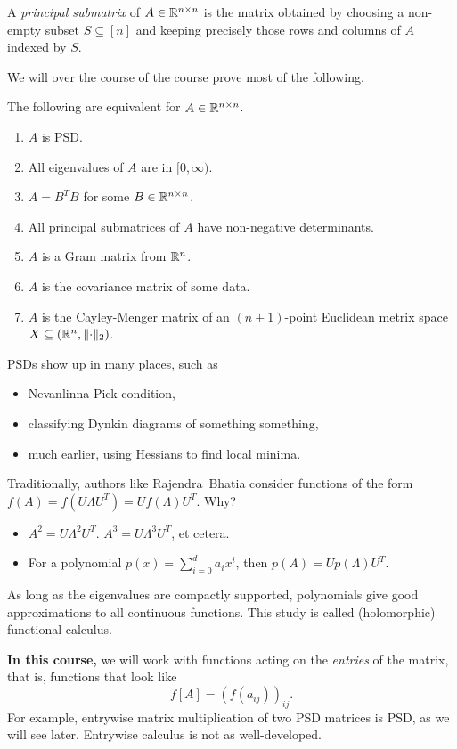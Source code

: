 A \emph{principal submatrix} of $A \in \mathbb{R}^{n \times n}$ is the matrix
obtained by choosing a non-empty subset $S \subseteq [n]$ and keeping
precisely those rows and columns of $A$ indexed by $S$.

We will over the course of the course prove most of the following.
\begin{theorem}
    The following are equivalent for $A \in \mathbb{R}^{n \times n}$.
    \begin{enumerate}
        \item $A$ is PSD.
        \item All eigenvalues of $A$ are in $[0, \infty)$.
        \item $A = B^T B$ for some $B \in \mathbb{R}^{n \times n}$.
        \item All principal submatrices of $A$ have non-negative
            determinants.
        \item $A$ is a Gram matrix from $\mathbb{R}^n$.
        \item $A$ is the covariance matrix of some data.
        \item $A$ is the Cayley-Menger matrix of an $(n + 1)$-point
            Euclidean metrix space $X \subseteq (\mathbb{R}^n, \lVert\cdot\rVert_2)$.
    \end{enumerate}
\end{theorem}
PSDs show up in many places, such as
\begin{itemize}
    \item Nevanlinna-Pick condition,
    \item classifying Dynkin diagrams of something something,
    \item much earlier, using Hessians to find local minima.
\end{itemize}

Traditionally, authors like Rajendra~Bhatia consider functions of the form
$f(A) = f(U \Lambda U^T) = U f(\Lambda) U^T$.
Why?
\begin{itemize}
    \item $A^2 = U \Lambda^2 U^T$.
        $A^3 = U \Lambda^3 U^T$, et cetera.
    \item For a polynomial $p(x) = \sum_{i=0}^d a_i x^i$, then
        $p(A) = U p(\Lambda) U^T$.
\end{itemize}
As long as the eigenvalues are compactly supported, polynomials give good
approximations to all continuous functions.
This study is called (holomorphic) functional calculus.

\textbf{In this course,} we will work with functions acting on the
\emph{entries} of the matrix, that is, functions that look like \[
    f[A] = (f(a_{ij}))_{ij}.
\] For example, entrywise matrix multiplication of two PSD matrices is PSD,
as we will see later.
Entrywise calculus is not as well-developed.

